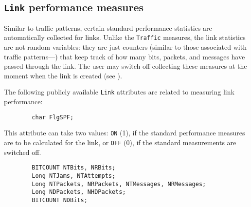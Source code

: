 \subsection{{\tt Link} performance measures}
\label{rm_pm_lk}

Similar to traffic patterns, certain standard performance statistics
are automatically collected for links.
Unlike the {\tt Traffic} measures, the link statistics are not random
variables: they are just counters (similar to those associated with
traffic patterns---) that keep track of how many bits,
packets, and messages have passed through the link.
The user may switch off collecting these measures at the moment when the
link is created (see ).

The following publicly available {\tt Link} attributes are related to
measuring link performance:
\begin{verbatim}
        char FlgSPF;
\end{verbatim}
This attribute can take two values: {\tt ON} (1), if the standard performance
measures are to be calculated for the link, or {\tt OFF} (0), if the
standard measurements are switched off.

\begin{verbatim}
        BITCOUNT NTBits, NRBits;
        Long NTJams, NTAttempts;
        Long NTPackets, NRPackets, NTMessages, NRMessages;
        Long NDPackets, NHDPackets;
        BITCOUNT NDBits;
\end{verbatim}

